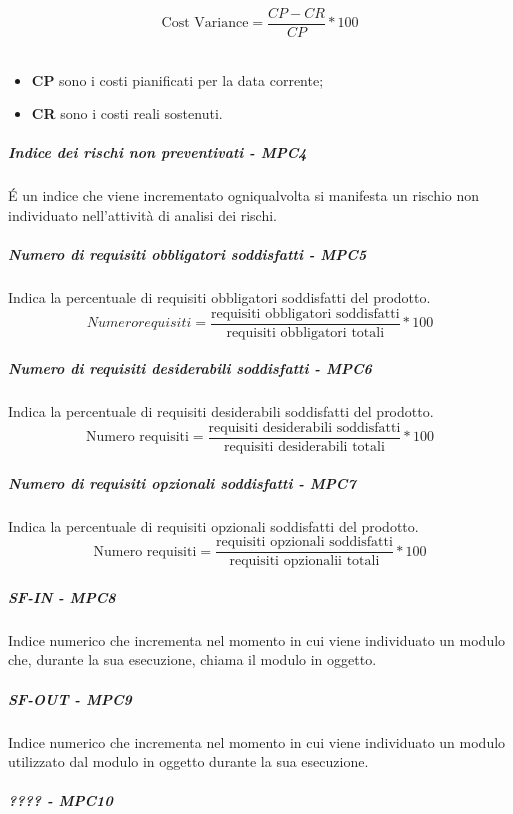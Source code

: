 \begin{equation*}
\text{Cost Variance} = \frac{CP - CR}{CP} * 100
\end{equation*}\\
\begin{itemize}
	\item \textbf{CP} sono i costi pianificati per la data corrente;
	\item \textbf{CR} sono i costi reali sostenuti.
\end{itemize}
\subparagraph{Indice dei rischi non preventivati - MPC4}
É un indice che viene incrementato ogniqualvolta si manifesta un rischio non individuato nell'attività di analisi dei rischi.
\subparagraph{Numero di requisiti obbligatori soddisfatti - MPC5}
Indica la percentuale di requisiti obbligatori soddisfatti del prodotto.
\begin{equation*}
Numero requisiti = \frac{\text{requisiti obbligatori soddisfatti}}{\text{requisiti obbligatori totali}} * 100
\end{equation*}
\subparagraph{Numero di requisiti desiderabili soddisfatti - MPC6}
Indica la percentuale di requisiti desiderabili soddisfatti del prodotto.
\begin{equation*}
\text{Numero requisiti} = \frac{\text{requisiti desiderabili soddisfatti}}{\text{requisiti desiderabili totali}} * 100
\end{equation*}
\subparagraph{Numero di requisiti opzionali soddisfatti - MPC7}
Indica la percentuale di requisiti opzionali soddisfatti del prodotto.
\begin{equation*}
\text{Numero requisiti} = \frac{\text{requisiti opzionali soddisfatti}}{\text{requisiti opzionalii totali}} * 100
\end{equation*}
\subparagraph{SF-IN - MPC8}
Indice numerico che incrementa nel momento in cui viene individuato un modulo che, durante la sua esecuzione, chiama il modulo in oggetto.
\subparagraph{SF-OUT - MPC9}
Indice numerico che incrementa nel momento in cui viene individuato un modulo utilizzato dal modulo in oggetto durante la sua esecuzione.
\subparagraph{???? - MPC10}

